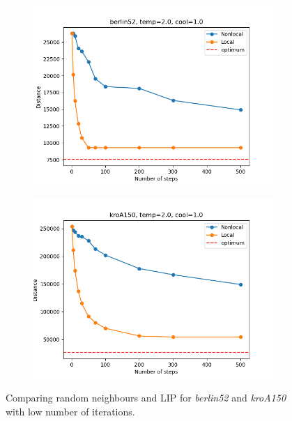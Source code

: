 \begin{figure}[!htb]
	\centering
	\begin{subfigure}{0.45\textwidth}
		\includegraphics[width=\textwidth]{img/berlin52_temp=2.0_cool=1.0_low_iter}
	\end{subfigure}
	\begin{subfigure}{0.45\textwidth}
		\includegraphics[width=\textwidth]{img/kroA150_temp=2.0_cool=1.0_low_iter}
	\end{subfigure}
	\caption{Comparing random neighbours and LIP for \textit{berlin52} and \textit{kroA150} with low number of iterations.}
	\label{fig:low_iter}
\end{figure}

